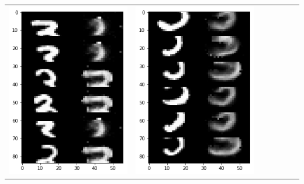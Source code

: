 \documentclass[12pt]{report} %
\begin{document}
\begin{tabular}{m{0.7cm}m{2.4cm}m{2.4cm}m{2.4cm}m{2.4cm}m{2.4cm}m{2.4cm}}
\includegraphics[scale=0.3]{pictures/M1_3_up.png} & \includegraphics[scale=0.3]{pictures/M1_3_down.png} &

\end{tabular}
\end{document}
